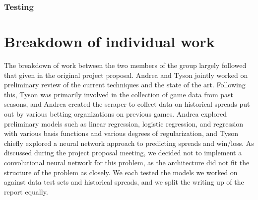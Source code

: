 \documentclass{article}
\begin{document}
\subsubsection{Testing}


\section{Breakdown of individual work}
The breakdown of work between the two members of the group largely followed that given in the original project proposal. Andrea and Tyson jointly worked on preliminary review of the current techniques and the state of the art. Following this, Tyson was primarily involved in the collection of game data from past seasons, and Andrea created the scraper to collect data on historical spreads put out by various betting organizations on previous games. Andrea explored preliminary models such as linear regression, logistic regression, and regression with various basis functions and various degrees of regularization, and Tyson chiefly explored a neural network approach to predicting spreads and win/loss. As discussed during the project proposal meeting, we decided not to implement a convolutional neural network for this problem, as the architecture did not fit the structure of the problem as closely. We each tested the models we worked on against data test sets and historical spreads, and we split the writing up of the report equally.
\end{document}
